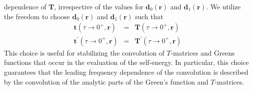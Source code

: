 dependence of $\mathbf{T}$, irrespective of the
values for $\mathbf{d}_0(\mathbf{r})$ and 
$\mathbf{d}_1(\mathbf{r})$.
We utilize the freedom to choose $\mathbf{d}_0(\mathbf{r})$ and 
$\mathbf{d}_1(\mathbf{r})$
such that
\begin{eqnarray}
\label{t-mat-tau0}
\mathbf{t}(\tau \to 0^+, \mathbf{r}) & = & 
\mathbf{T}(\tau \to 0^+, \mathbf{r}) \\
\mathbf{t}^{\prime}(\tau \to 0^+, \mathbf{r}) & = & 
\mathbf{T}^{\prime}(\tau \to 0^+, \mathbf{r})
\end{eqnarray}
This choice is useful
for stabilizing the convolution of $T$-matrices and
Greens functions that occur in the evaluation of the
self-energy.  In particular, this choice guarantees that
the leading frequency dependence of the convolution is
described by the convolution of the analytic parts of
the Green's function and $T$-matrices.

